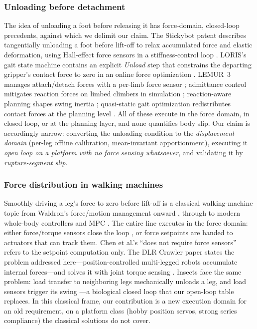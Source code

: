 \documentclass[journal]{IEEEtran}
\begin{document}
\subsubsection{Unloading before detachment} The idea of unloading a foot
before releasing it has force-domain, closed-loop precedents, against
which we delimit our claim. The Stickybot patent describes tangentially
unloading a foot before lift-off to relax accumulated force and elastic
deformation, using Hall-effect force sensors in a stiffness-control loop
\cite{cutkosky2010patent}. LORIS's gait state machine contains an
explicit \emph{Unload} step that constrains the departing gripper's
contact force to zero in an online force optimization
\cite{nadan2024loris}. LEMUR~3 manages attach/detach forces with a
per-limb force sensor \cite{parness2017lemur}; admittance control
mitigates reaction forces on limbed climbers in simulation
\cite{imai2024admittance}; reaction-aware planning shapes swing inertia
\cite{ribeiro2023ramp}; quasi-static gait optimization redistributes
contact forces at the planning level \cite{boscariol2013optimal}.
All of these execute in the force domain, in closed loop, or at the
planning layer, and none quantifies body slip. Our claim is accordingly
narrow: converting the unloading condition to the \emph{displacement
domain} (per-leg offline calibration, mean-invariant apportionment),
executing it \emph{open loop on a platform with no force sensing
whatsoever}, and validating it by \emph{rupture-segment slip}.

\subsubsection{Force distribution in walking machines} Smoothly driving
a leg's force to zero before lift-off is a classical walking-machine
topic from Waldron's force/motion management onward
\cite{waldron1986force,kumar1988force,klein1990optimal,zhou2000fricom,
erden2007torque}, through to modern whole-body controllers and MPC
\cite{righetti2013optimal,bellicoso2016perception,focchi2017high,
dicarlo2018dynamic}. The entire line executes in the force domain: either
force/torque sensors close the loop \cite{gorinevsky1990force,
gorner2009dlr}, or force setpoints are handed to actuators that can track
them. Chen et al.'s ``does not require force sensors''
\cite{chen1999optimal} refers to the setpoint computation only. The DLR
Crawler paper states the problem addressed here---position-controlled
multi-legged robots accumulate internal forces---and solves it with joint
torque sensing \cite{gorner2009dlr}. Insects face the same problem: load transfer
to neighboring legs mechanically unloads a leg, and load sensors trigger
its swing \cite{dallmann2017load}---a biological closed loop that our
open-loop table replaces. In this classical frame, our contribution is a
new execution domain for an old requirement, on a platform class (hobby
position servos, strong series compliance) the classical solutions do
not cover.
\end{document}
